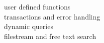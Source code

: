 \documentclass{article}
\begin{document}
    user defined functions \\
    transactions and error handling \\
    dynamic queries \\
    filestream and free text search
\end{document}
